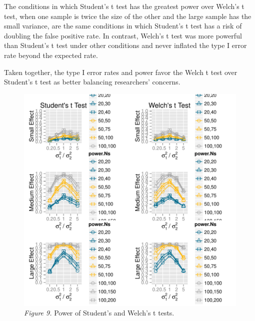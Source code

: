 \documentclass[man,a4paper,noextraspace,apacite]{apa6}
\begin{document}
    The conditions in which Student's t test has the greatest power over Welch's t test, when one sample is twice the size of the other and the large sample has the small variance, are the same conditions in which Student's t test has a risk of doubling the false positive rate. In contrast, Welch's t test was more powerful than Student's t test under other conditions and never inflated the type I error rate beyond the expected rate.

    Taken together, the type I error rates and power favor the Welch t test over Student's t test as better balancing researchers' concerns.
\begin{figure}
\includegraphics{WelchManuscript-MASTER-plotPower}
\textit{Figure 9.} Power of Student's and Welch's t tests.
\end{figure}
\end{document}

